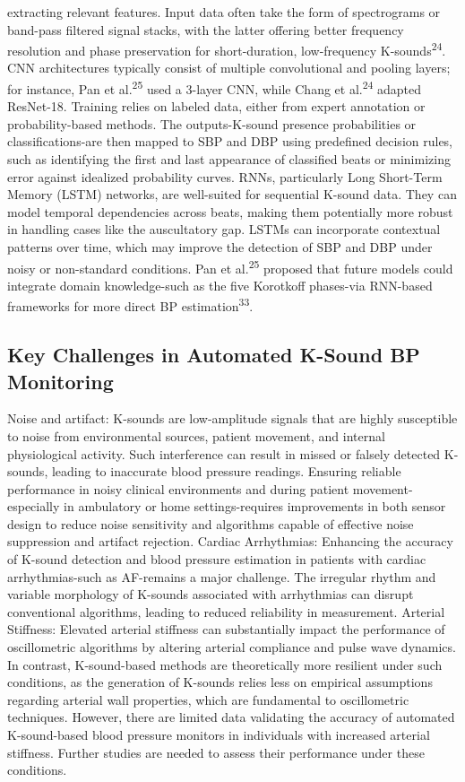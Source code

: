 \documentclass[
  12pt,
  letterpaper,
  openany,
  oneside]{book}
\begin{document}
extracting relevant features. Input data often take the form of
spectrograms or band-pass filtered signal stacks, with the latter
offering better frequency resolution and phase preservation for
short-duration, low-frequency K-sounds\textsuperscript{24}. CNN
architectures typically consist of multiple convolutional and pooling
layers; for instance, Pan et al.\textsuperscript{25} used a 3-layer CNN,
while Chang et al.\textsuperscript{24} adapted ResNet-18. Training
relies on labeled data, either from expert annotation or
probability-based methods. The outputs-K-sound presence probabilities or
classifications-are then mapped to SBP and DBP using predefined decision
rules, such as identifying the first and last appearance of classified
beats or minimizing error against idealized probability curves. RNNs,
particularly Long Short-Term Memory (LSTM) networks, are well-suited for
sequential K-sound data. They can model temporal dependencies across
beats, making them potentially more robust in handling cases like the
auscultatory gap. LSTMs can incorporate contextual patterns over time,
which may improve the detection of SBP and DBP under noisy or
non-standard conditions. Pan et al.\textsuperscript{25} proposed that
future models could integrate domain knowledge-such as the five
Korotkoff phases-via RNN-based frameworks for more direct BP
estimation\textsuperscript{33}.

\subsection{Key Challenges in Automated K-Sound BP
Monitoring}\label{key-challenges-in-automated-k-sound-bp-monitoring}

Noise and artifact: K-sounds are low-amplitude signals that are highly
susceptible to noise from environmental sources, patient movement, and
internal physiological activity. Such interference can result in missed
or falsely detected K-sounds, leading to inaccurate blood pressure
readings. Ensuring reliable performance in noisy clinical environments
and during patient movement-especially in ambulatory or home
settings-requires improvements in both sensor design to reduce noise
sensitivity and algorithms capable of effective noise suppression and
artifact rejection. Cardiac Arrhythmias: Enhancing the accuracy of
K-sound detection and blood pressure estimation in patients with cardiac
arrhythmias-such as AF-remains a major challenge. The irregular rhythm
and variable morphology of K-sounds associated with arrhythmias can
disrupt conventional algorithms, leading to reduced reliability in
measurement. Arterial Stiffness: Elevated arterial stiffness can
substantially impact the performance of oscillometric algorithms by
altering arterial compliance and pulse wave dynamics. In contrast,
K-sound-based methods are theoretically more resilient under such
conditions, as the generation of K-sounds relies less on empirical
assumptions regarding arterial wall properties, which are fundamental to
oscillometric techniques. However, there are limited data validating the
accuracy of automated K-sound-based blood pressure monitors in
individuals with increased arterial stiffness. Further studies are
needed to assess their performance under these conditions.
\end{document}
